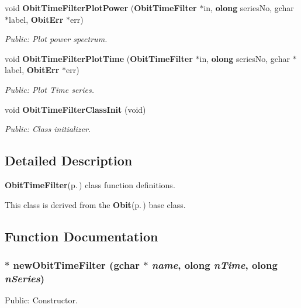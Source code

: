 \begin{CompactItemize}
void {\bf Obit\-Time\-Filter\-Plot\-Power} ({\bf Obit\-Time\-Filter} $\ast$in, {\bf olong} series\-No, gchar $\ast$label, {\bf Obit\-Err} $\ast$err)
\begin{CompactList}\small\item\em Public: Plot power spectrum. \item\end{CompactList}\item 
void {\bf Obit\-Time\-Filter\-Plot\-Time} ({\bf Obit\-Time\-Filter} $\ast$in, {\bf olong} series\-No, gchar $\ast$label, {\bf Obit\-Err} $\ast$err)
\begin{CompactList}\small\item\em Public: Plot Time series. \item\end{CompactList}\item 
void {\bf Obit\-Time\-Filter\-Class\-Init} (void)
\begin{CompactList}\small\item\em Public: Class initializer. \item\end{CompactList}\end{CompactItemize}


\subsection{Detailed Description}
{\bf Obit\-Time\-Filter}{\rm (p.\,\pageref{structObitTimeFilter})} class function definitions. 

This class is derived from the {\bf Obit}{\rm (p.\,\pageref{structObit})} base class.

\subsection{Function Documentation}
\subsubsection{$\ast$ new\-Obit\-Time\-Filter (gchar $\ast$ {\em name}, {\bf olong} {\em n\-Time}, {\bf olong} {\em n\-Series})}\label{ObitTimeFilter_8c_a7}


Public: Constructor. 


